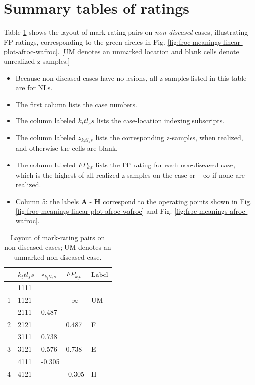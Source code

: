 \documentclass[
]{book}
\providecommand{\tightlist}{%
  \setlength{\itemsep}{0pt}\setlength{\parskip}{0pt}}
\begin{document}
\hypertarget{summary-tables-of-ratings}{%
\section{Summary tables of ratings}\label{summary-tables-of-ratings}}

Table \ref{tab:froc-meanings-table-non-diseased} shows the layout of mark-rating pairs on \emph{non-diseased} cases, illustrating FP ratings, corresponding to the green circles in Fig. \ref{fig:froc-meanings-linear-plot-afroc-wafroc}. {[}UM denotes an unmarked location and blank cells denote unrealized z-samples.{]}

\begin{itemize}
\tightlist
\item
  Because non-diseased cases have no lesions, all z-samples listed in this table are for NLs.
\item
  The first column lists the case numbers.
\item
  The column labeled \(k_t t l_s s\) lists the case-location indexing subscripts.
\item
  The column labeled \(z_{k_t t l_s s}\) lists the corresponding z-samples, when realized, and otherwise the cells are blank.
\item
  The column labeled \(FP_{k_t t}\) lists the FP rating for each non-diseased case, which is the highest of all realized z-samples on the case or \(-\infty\) if none are realized.
\item
  Column 5: the labels \textbf{A} - \textbf{H} correspond to the operating points shown in Fig. \ref{fig:froc-meanings-linear-plot-afroc-wafroc} and Fig. \ref{fig:froc-meanings-afroc-wafroc}.
\end{itemize}

\begin{table}

\caption{\label{tab:froc-meanings-table-non-diseased}Layout of mark-rating  pairs on non-diseased cases; UM denotes an unmarked non-diseased case.}
\centering
\begin{tabular}[t]{l|l|l|l|l}
\hline
 & $k_t t l_s s$ & $z_{k_t t l_s s}$ & $FP_{k_t t}$ & $\text{Label}$\\
\hline
 & 1111 &  &  & \\
\hline
1 & 1121 &  & $-\infty$ & UM\\
\hline
 & 2111 & 0.487 &  & \\
\hline
2 & 2121 &  & 0.487 & F\\
\hline
 & 3111 & 0.738 &  & \\
\hline
3 & 3121 & 0.576 & 0.738 & E\\
\hline
 & 4111 & -0.305 &  & \\
\hline
4 & 4121 &  & -0.305 & H\\
\hline
\end{tabular}
\end{table}
\end{document}
